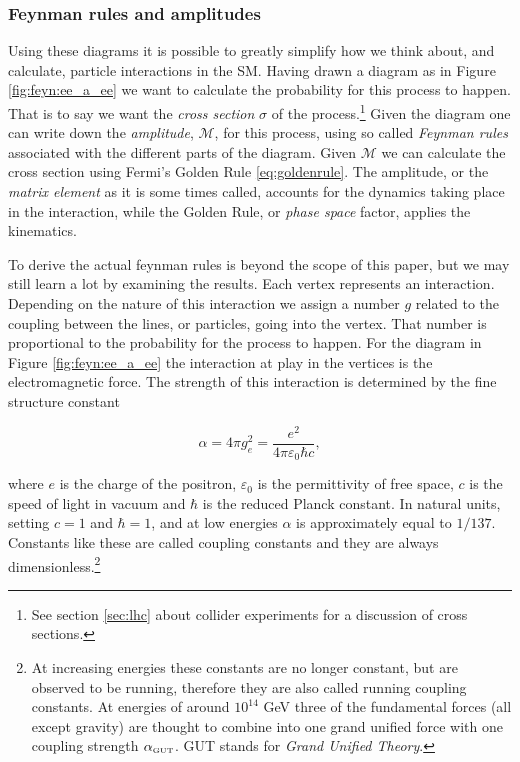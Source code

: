 \subsubsection{Feynman rules and amplitudes}
Using these diagrams it is possible to greatly simplify how we think about, and calculate, particle interactions in the SM. Having drawn a diagram as in Figure \ref{fig:feyn:ee_a_ee} we want to calculate the probability for this process to happen. That is to say we want the \emph{cross section} $\sigma$ of the process.\footnote{See section \ref{sec:lhc} about collider experiments for a discussion of cross sections.} Given the diagram one can write down the \emph{amplitude}, $\mathcal{M}$, for this process, using so called \emph{Feynman rules} associated with the different parts of the diagram. Given $\mathcal{M}$ we can calculate the cross section using Fermi's Golden Rule \eqref{eq:goldenrule}. The amplitude, or the \emph{matrix element} as it is some times called, accounts for the dynamics taking place in the interaction, while the Golden Rule, or \emph{phase space} factor, applies the kinematics.

To derive the actual feynman rules is beyond the scope of this paper, but we may still learn a lot by examining the results. Each vertex represents an interaction. Depending on the nature of this interaction we assign a number $g$ related to the coupling between the lines, or particles, going into the vertex. That number is proportional to the probability for the process to happen. For the diagram in Figure \ref{fig:feyn:ee_a_ee} the interaction at play in the vertices is the electromagnetic force. The strength of this interaction is determined by the fine structure constant

\begin{equation}
	\alpha = 4\pi g_e^2 = \frac{e^2}{4\pi\varepsilon_0\hbar c},
\end{equation}

where $e$ is the charge of the positron, $\varepsilon_0$ is the permittivity of free space, $c$ is the speed of light in vacuum and $\hbar$ is the reduced Planck constant. In natural units, setting $c = 1$ and $\hbar = 1$, and at low energies $\alpha$ is approximately equal to $1/137$. Constants like these are called coupling constants and they are always dimensionless.\footnote{At increasing energies these constants are no longer constant, but are observed to be running, therefore they are also called running coupling constants. At energies of around $10^{14}$ GeV three of the fundamental forces (all except gravity) are thought to combine into one grand unified force with one coupling strength $\alpha_{\textrm{\tiny{GUT}}}$. GUT stands for \emph{Grand Unified Theory}.}

